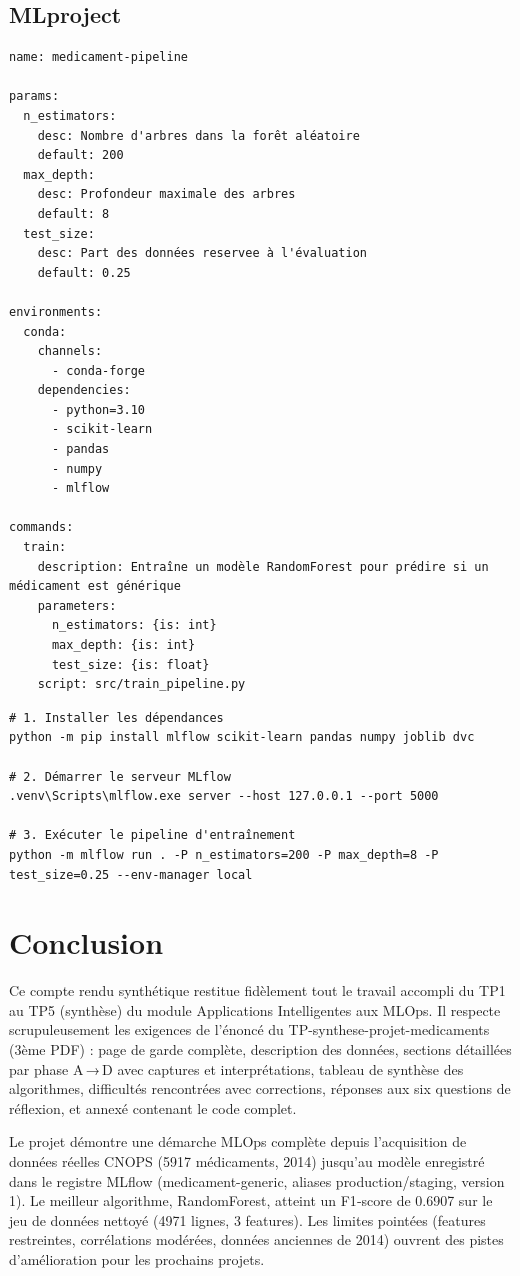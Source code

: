 \documentclass[12pt,a4paper]{report}
\begin{document}
\section{MLproject}
\begin{verbatim}
name: medicament-pipeline

params:
  n_estimators:
    desc: Nombre d'arbres dans la forêt aléatoire
    default: 200
  max_depth:
    desc: Profondeur maximale des arbres
    default: 8
  test_size:
    desc: Part des données reservee à l'évaluation
    default: 0.25

environments:
  conda:
    channels:
      - conda-forge
    dependencies:
      - python=3.10
      - scikit-learn
      - pandas
      - numpy
      - mlflow

commands:
  train:
    description: Entraîne un modèle RandomForest pour prédire si un médicament est générique
    parameters:
      n_estimators: {is: int}
      max_depth: {is: int}
      test_size: {is: float}
    script: src/train_pipeline.py
\end{verbatim}

\begin{verbatim}
# 1. Installer les dépendances
python -m pip install mlflow scikit-learn pandas numpy joblib dvc

# 2. Démarrer le serveur MLflow
.venv\Scripts\mlflow.exe server --host 127.0.0.1 --port 5000

# 3. Exécuter le pipeline d'entraînement
python -m mlflow run . -P n_estimators=200 -P max_depth=8 -P test_size=0.25 --env-manager local
\end{verbatim}

\chapter*{Conclusion}
Ce compte rendu synthétique restitue fidèlement tout le travail accompli du TP1 au TP5 (synthèse) du module Applications Intelligentes aux MLOps. Il respecte scrupuleusement les exigences de l'énoncé du TP-synthese-projet-medicaments (3ème PDF) : page de garde complète, description des données, sections détaillées par phase A → D avec captures et interprétations, tableau de synthèse des algorithmes, difficultés rencontrées avec corrections, réponses aux six questions de réflexion, et annexé contenant le code complet.

Le projet démontre une démarche MLOps complète depuis l'acquisition de données réelles CNOPS (5917 médicaments, 2014) jusqu'au modèle enregistré dans le registre MLflow (medicament-generic, aliases production/staging, version 1). Le meilleur algorithme, RandomForest, atteint un F1‑score de 0.6907 sur le jeu de données nettoyé (4971 lignes, 3 features). Les limites pointées (features restreintes, corrélations modérées, données anciennes de 2014) ouvrent des pistes d'amélioration pour les prochains projets.
\end{document}
